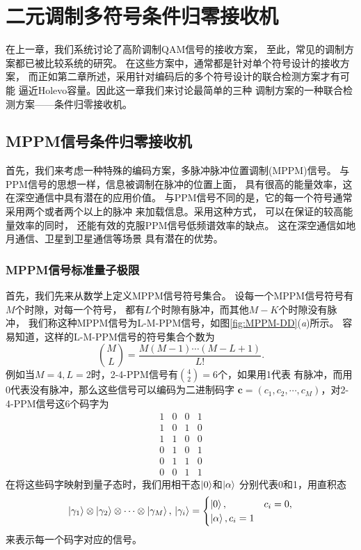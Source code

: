 \chapter{二元调制多符号条件归零接收机}
在上一章，我们系统讨论了高阶调制QAM信号的接收方案，
至此，常见的调制方案都已被比较系统的研究。
在这些方案中，通常都是针对单个符号设计的接收方案，
而正如第二章所述，采用针对编码后的多个符号设计的联合检测方案才有可能
逼近Holevo容量。因此这一章我们来讨论最简单的三种
调制方案的一种联合检测方案——条件归零接收机。


\section{MPPM信号条件归零接收机}
首先，我们来考虑一种特殊的编码方案，多脉冲脉冲位置调制(MPPM)信号。
与PPM信号的思想一样，信息被调制在脉冲的位置上面，
具有很高的能量效率，这在深空通信中具有潜在的应用价值\cite{hemmati2006deep}。
与PPM信号不同的是，它的每一个符号通常采用两个或者两个以上的脉冲
来加载信息。采用这种方式，
可以在保证的较高能量效率的同时，
还能有效的克服PPM信号低频谱效率的缺点\cite{sugiyama1989mppm}。
这在深空通信如地月通信、卫星到卫星通信等场景
具有潜在的优势\cite{hemmati2006deep,waseda2011numerical}。

\subsection{MPPM信号标准量子极限}
首先，我们先来从数学上定义MPPM信号符号集合。
设每一个MPPM信号符号有$M$个时隙，对每一个符号，
都有$L$个时隙有脉冲，而其他$M-K$个时隙没有脉冲，
我们称这种MPPM信号为L-M-PPM信号，如图\ref{fig:MPPM-DD}(\textit{a})所示。
容易知道，这样的L-M-PPM信号的符号集合个数为
\begin{equation}
\binom{M}{L} = \frac{M(M-1)\cdots(M-L+1)}{L!}.
\end{equation}
例如当$M=4, L=2$时，2-4-PPM信号有$\binom{4}{2}=6$个，如果用1代表
有脉冲，而用0代表没有脉冲，那么这些信号可以编码为二进制码字
$\bm{c} = (c_1, c_2, \cdots, c_M)$，对2-4-PPM信号这6个码字为
\begin{equation}
\begin{array}{cccc}
1 & 0 & 0 & 1 \\
1 & 0 & 1 & 0 \\
1 & 1 & 0 & 0 \\
0 & 1 & 0 & 1 \\
0 & 1 & 1 & 0 \\
0 & 0 & 1 & 1   
\end{array}
\end{equation}
在将这些码字映射到量子态时，我们用相干态$\ket{0}$和$\ket{\alpha}$
分别代表0和1，用直积态
\begin{equation}
\ket{\gamma_1}\otimes\ket{\gamma_2}\otimes\cdots\otimes\ket{\gamma_M}, \\
\ket{\gamma_i} = \begin{cases}
                    \ket{0}, & c_i=0, \\
                    \ket{\alpha}, c_i=1
                \end{cases}
\end{equation}
来表示每一个码字对应的信号。

